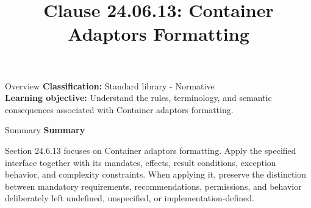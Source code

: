 \documentclass[10pt,letterpaper]{article}
\title{Clause 24.06.13: Container Adaptors Formatting}
\author{}
\date{}
\begin{document}
\maketitle
\begin{CornellOverviewBox}{Overview}
\textbf{Classification:} Standard library - Normative\\[2pt]
\textbf{Learning objective:} Understand the rules, terminology, and semantic consequences associated with Container adaptors formatting.
\end{CornellOverviewBox}\begin{CornellSummaryBox}{Summary}
{\sffamily\bfseries\color{Accent} Summary}\par\vspace{3pt}Section 24.6.13 focuses on Container adaptors formatting. Apply the specified interface together with its mandates, effects, result conditions, exception behavior, and complexity constraints. When applying it, preserve the distinction between mandatory requirements, recommendations, permissions, and behavior deliberately left undefined, unspecified, or implementation-defined.
\end{CornellSummaryBox}
\end{document}
